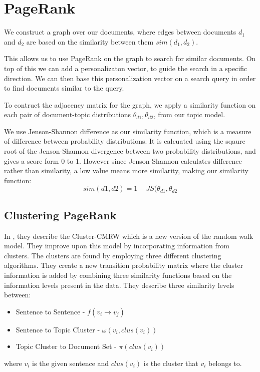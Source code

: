 \section{PageRank}\label{sec:pagerank}
We construct a graph over our documents, where edges between documents $d_1$ and $d_2$ are based on the similarity between them $sim(d_1, d_2)$.

This allows us to use PageRank on the graph to search for similar documents.
On top of this we can add a personalizaton vector, to guide the search in a specific direction.
We can then base this personalization vector on a search query in order to find documents similar to the query.

To contruct the adjacency matrix for the graph, we apply a similarity function on each pair of document-topic distributions $\theta_{d1}, \theta_{d2}$, from our topic model.

We use Jenson-Shannon difference as our similarity function, which is a measure of difference between probability distributions\cite{jensen-shannon2003}\cite{jensen-shannondis2003}.
It is calcuated using the sqaure root of the Jenson-Shannon divergence between two probability distributions, and gives a score form 0 to 1.
However since Jenson-Shannon calculates difference rather than similarity, a low value means more similarity, making our similarity function:
$$sim(d1, d2) = 1 - JS(\theta_{d1}, \theta_{d2}$$


\subsection{Clustering PageRank}

In \cite{ClusterPageRank}, they describe the \gls{Cluster-CMRW} which is a new version of the random walk model. 
They improve upon this model by incorporating information from clusters. 
The clusters are found by employing three different clustering algorithms.
They create a new transition probability matrix where the cluster information is added by combining three similarity functions based on the information levels present in the data.
They describe three similarity levels between:
\begin{itemize}
    \item Sentence to Sentence - $f(v_i \rightarrow v_j)$
    \item Sentence to Topic Cluster - $\omega(v_i, clus(v_i))$
    \item Topic Cluster to Document Set - $\pi(clus(v_i))$
\end{itemize}
where $v_i$ is the given sentence and $clus(v_i)$ is the cluster that $v_i$ belongs to.

